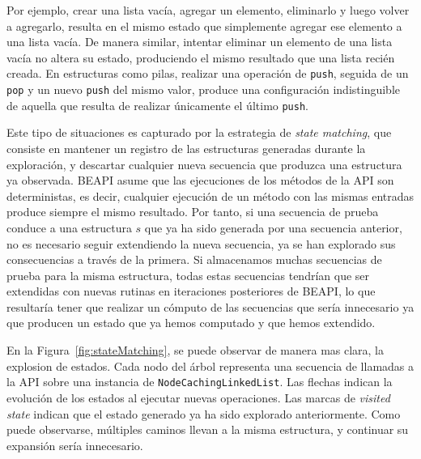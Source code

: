 Por ejemplo, crear una lista vacía, agregar un elemento, eliminarlo y luego volver a agregarlo, resulta en el mismo estado que simplemente agregar ese elemento a una lista vacía. 
De manera similar, intentar eliminar un elemento de una lista vacía no altera su estado, produciendo el mismo resultado que una lista recién creada. 
En estructuras como pilas, realizar una operación de \texttt{push}, seguida de un \texttt{pop} y un nuevo \texttt{push} del mismo valor, 
produce una configuración indistinguible de aquella que resulta de realizar únicamente el último \texttt{push}. 

Este tipo de situaciones es capturado por la estrategia de \emph{state matching}, que consiste en mantener un registro de las estructuras generadas durante la exploración, y descartar cualquier nueva secuencia que produzca una estructura ya observada. 
\textsf{BEAPI} asume que las ejecuciones de los métodos de la API son deterministas, es decir, cualquier ejecución de un método con las mismas entradas produce siempre el mismo resultado. 
Por tanto, si una secuencia de prueba conduce a una estructura $s$ que ya ha sido generada por una secuencia anterior, no es necesario seguir extendiendo la nueva secuencia, 
ya se han explorado sus consecuencias a través de la primera.
Si almacenamos muchas secuencias de prueba para la misma estructura, todas estas secuencias tendrían que ser extendidas con nuevas rutinas en iteraciones posteriores de \textsf{BEAPI}, 
lo que resultaría tener que realizar un cómputo de las secuencias que sería innecesario ya que producen un estado que ya hemos computado y que hemos extendido.  

En la Figura~\ref{fig:stateMatching}, se puede observar de manera mas clara, la explosion de estados. 
Cada nodo del árbol representa una secuencia de llamadas a la API sobre una instancia de \texttt{NodeCachingLinkedList}. 
Las flechas indican la evolución de los estados al ejecutar nuevas operaciones. 
Las marcas de \emph{visited state}  indican que el estado generado ya ha sido explorado anteriormente. 
Como puede observarse, múltiples caminos llevan a la misma estructura, y continuar su expansión sería innecesario.

